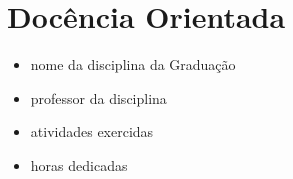 \chapter{Docência Orientada}\label{ch:introducao}
\begin{itemize}
	\item nome da disciplina da Graduação
	\item professor da disciplina
	\item atividades exercidas 
	\item horas dedicadas
\end{itemize}